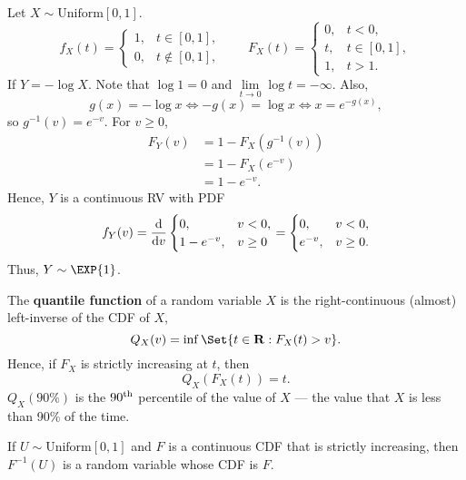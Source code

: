 \begin{Example}{}{}
    Let $ X\sim \text{Uniform}[0,1] $.
    \[ f_X(t)=\begin{cases}
            1, & t\in[0,1],    \\
            0, & t\notin[0,1],
        \end{cases}\qquad
        F_X(t)=\begin{cases}
            0, & t<0,       \\
            t, & t\in[0,1], \\
            1, & t>1.
        \end{cases} \]
    If $ Y=-\log{X} $. Note that $ \log{1}=0 $ and $ \lim\limits_{{t} \to {0}}\log{t}=-\infty $.
    Also,
    \[ g(x)=-\log{x}\iff -g(x)=\log{x}\iff x=e^{-g(x)}, \]
    so $ g^{-1}(v)=e^{-v} $.
    For $ v\ge 0 $,
    \begin{align*}
        F_Y(v)
         & =1-F_X(g^{-1}(v)) \\
         & =1-F_X(e^{-v})    \\
         & =1-e^{-v}.
    \end{align*}
    Hence, $ Y $ is a continuous RV with PDF
    \[ f_Y(v)=\odv*{
            \begin{cases}
                0,        & v<0,   \\
                1-e^{-v}, & v\ge 0
            \end{cases}
        }{v}=\begin{cases}
            0,      & v<0,    \\
            e^{-v}, & v\ge 0.
        \end{cases} \]
    Thus, $ Y\sim \EXP{1} $.
\end{Example}
\begin{Definition}{}{}
    The \textbf{quantile function} of a random variable $ X $
    is the right-continuous (almost) left-inverse of the CDF of $ X $,
    \[ Q_X(v)=\inf\Set{t\in\mathbf{R}:F_X(t)> v}. \]
    Hence, if $ F_X $ is strictly increasing at $ t $, then
    \[ Q_X(F_X(t))=t. \]
    $ Q_X(90\%) $ is the $ 90\textsuperscript{th} $ percentile
    of the value of $ X $ --- the value that $ X $ is less than 90\% of the time.
\end{Definition}
\begin{Theorem}{}{}
    If $ U\sim\text{Uniform}[0,1] $ and $ F $ is a continuous CDF that is
    strictly increasing, then
    $ F^{-1}(U) $ is a random variable whose CDF is $ F $.
\end{Theorem}
